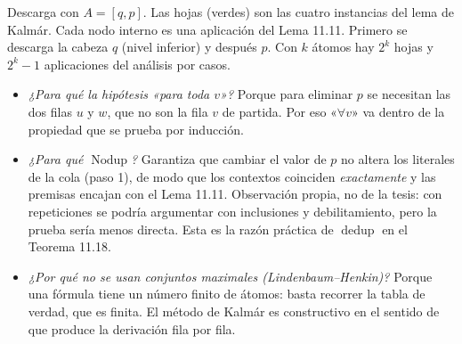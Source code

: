 \documentclass[11pt,a4paper]{article}
\newcommand{\Provnd}{\vdash_{\mathrm{ND}}}
\newcommand{\Not}{\neg}
\newcommand{\Nodup}{\operatorname{Nodup}}
\newcommand{\dedup}{\operatorname{dedup}}
\begin{document}
\begin{center}
\end{center}
{\small Descarga con \(A=[q,p]\). Las hojas (verdes) son las cuatro
instancias del lema de Kalmár. Cada nodo interno es una aplicación del
Lema 11.11. Primero se descarga la cabeza \(q\) (nivel inferior) y después
\(p\). Con \(k\) átomos hay \(2^k\) hojas y \(2^k-1\) aplicaciones del
análisis por casos.}

\begin{trampa}
\begin{itemize}
  \item \emph{¿Para qué la hipótesis «para toda \(v\)»?} Porque para eliminar
    \(p\) se necesitan las dos filas \(u\) y \(w\), que no son la fila \(v\) de
    partida. Por eso «\(\forall v\)» va dentro de la propiedad que se prueba
    por inducción.
  \item \emph{¿Para qué \(\Nodup\)?} Garantiza que cambiar el valor de \(p\) no
    altera los literales de la cola (paso 1), de modo que los contextos
    coinciden \emph{exactamente} y las premisas encajan con el Lema 11.11.
    Observación propia, no de la tesis: con repeticiones se podría argumentar
    con inclusiones y debilitamiento, pero la prueba sería menos directa.
    Esta es la razón práctica de \(\dedup\) en el Teorema 11.18.
  \item \emph{¿Por qué no se usan conjuntos maximales (Lindenbaum--Henkin)?}
    Porque una fórmula tiene un número finito de átomos: basta recorrer la
    tabla de verdad, que es finita. El método de Kalmár es constructivo en el
    sentido de que produce la derivación fila por fila.
\end{itemize}
\end{trampa}
\end{document}
